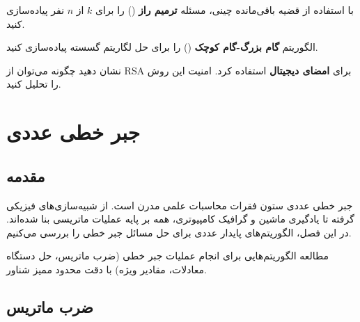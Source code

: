 \documentclass{matinbook}
\begin{document}
    \begin{exercise}
        با استفاده از قضیه باقی‌مانده چینی،
        مسئله \textbf{ترمیم راز} ()
        را برای $k$ از $n$ نفر پیاده‌سازی کنید.
        \label{exc:secret-sharing}
    \end{exercise}
    
    \begin{exercise}
        الگوریتم \textbf{گام بزرگ-گام کوچک}
        () را
        برای حل لگاریتم گسسته پیاده‌سازی کنید.
        \label{exc:bsgs}
    \end{exercise}
    
    \begin{exercise}
        نشان دهید چگونه می‌توان
        از RSA برای \textbf{امضای دیجیتال}
        استفاده کرد. امنیت این روش را
        تحلیل کنید.
        \label{exc:rsa-signature}
    \end{exercise}
    
    
    
    
    \chapter{جبر خطی عددی}
    \label{chap:numerical-linear-algebra}
    
    \section{مقدمه}
    
    جبر خطی عددی
    ستون فقرات محاسبات علمی مدرن است.
    از شبیه‌سازی‌های فیزیکی گرفته
    تا یادگیری ماشین و گرافیک کامپیوتری،
    همه بر پایه عملیات ماتریسی بنا شده‌اند.
    در این فصل، الگوریتم‌های پایدار عددی
    برای حل مسائل جبر خطی را بررسی می‌کنیم.
    
    \begin{definition}
        مطالعه الگوریتم‌هایی برای انجام
        عملیات جبر خطی (ضرب ماتریس،
        حل دستگاه معادلات، مقادیر ویژه)
        با دقت محدود ممیز شناور.
        \label{def:numerical-linear-algebra}
    \end{definition}
    
    \section{ضرب ماتریس}
    
\end{document}
